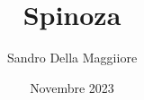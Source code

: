 \documentclass[a4paper,12pt,notitlepage]{report}
\begin{document}
	\author{Sandro Della Maggiiore}
	\title{Spinoza}
	\date{Novembre 2023}
	\maketitle
	
	

	
	
	
\end{document}
